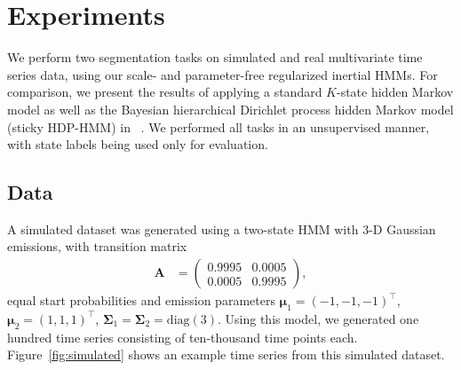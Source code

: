\documentclass[letterpaper]{article}
\begin{document}
%
%
\section{Experiments}\label{sec:Experiments}

We perform two segmentation tasks on simulated and real multivariate time series
data, using our scale- and parameter-free regularized inertial HMMs. For
comparison, we present the results of applying a standard $K$-state hidden
Markov model as well as the Bayesian hierarchical Dirichlet process hidden
Markov model (sticky HDP-HMM) in ~\cite{fox2011sticky}. We
performed all tasks in an unsupervised manner, with state labels being used only
for evaluation.

\subsection{Data}\label{sec:datasets}

A simulated dataset was generated using a two-state HMM with 3-D Gaussian emissions, with transition matrix
\begin{align*}
    \mathbf{A} &= \left( 
                   \begin{array}{ccc}
                    0.9995 & 0.0005 \\
                    0.0005 & 0.9995
                   \end{array}
                   \right),
\end{align*}
equal start probabilities and emission parameters $\mathbf{\mu}_1 = (-1, -1, -1)^\top$, $\mathbf{\mu}_2 = (1, 1, 1)^\top$, $\mathbf{\Sigma}_1 = \mathbf{\Sigma}_2 = \text{diag}(3)$. Using this model, we generated one hundred time series consisting of ten-thousand time points each. Figure~\ref{fig:simulated} shows an example time series from this simulated dataset.
\end{document}
